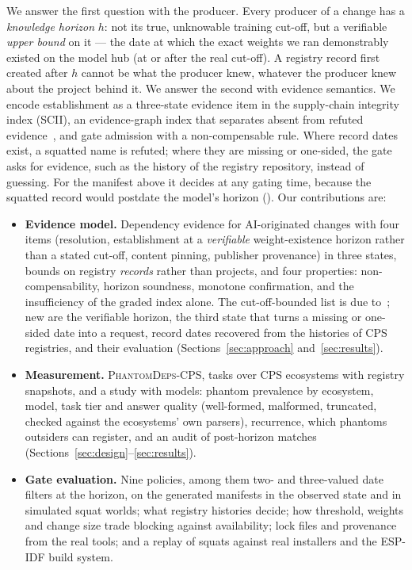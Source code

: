 \documentclass[conference]{IEEEtran}
\newif\ifpilot     \pilotfalse      %
\begin{document}
We answer the first question with the producer. Every producer of a change has a \emph{knowledge horizon} $h$: not its
true, unknowable training cut-off, but a verifiable \emph{upper bound} on it --- the date at which the exact weights we
ran demonstrably existed on the model hub (at or after the real cut-off). A registry record first created after $h$
cannot be what the producer knew, whatever the producer knew about the project behind it. We answer the second with evidence semantics. We encode establishment as a three-state evidence item in the
supply-chain integrity index (SCII), an evidence-graph index that separates absent from refuted
evidence~\cite{anon2026evidence}, and gate admission with a non-compensable rule. Where record dates exist, a squatted
name is refuted; where they are missing or one-sided, the gate asks for evidence, such as the history of the registry
repository, instead of guessing.
\ifnum{} For the manifest above it decides \rExSqDec{} at any gating time, because the squatted record
would postdate the model's horizon (\rExHorizon).\fi{} Our contributions are:
\begin{itemize}
\item \textbf{Evidence model.} Dependency evidence for AI-originated changes with four items (resolution,
establishment at a \emph{verifiable} weight-existence horizon rather than a stated cut-off, content pinning,
publisher provenance) in three states, bounds on registry \emph{records} rather than projects, and four properties:
non-compensability, horizon soundness, monotone confirmation, and the insufficiency of the graded index alone. The
cut-off-bounded list is due to~\cite{krishna2025phantoms}; new are the verifiable horizon, the third state that turns
a missing or one-sided date into a request, record dates recovered from the histories of CPS registries, and their
evaluation (Sections~\ref{sec:approach} and~\ref{sec:results}).
\item \textbf{Measurement.} \textsc{PhantomDeps-CPS}, \rNTasks{} tasks over \rNEcos{} CPS ecosystems with
registry snapshots, and a \ifpilot pilot\else study\fi{} with \rNModels{} models: phantom prevalence by ecosystem, model, task tier and answer
quality (well-formed, malformed, truncated, checked against the ecosystems' own parsers), recurrence, which phantoms
outsiders can register, and an audit of post-horizon matches (Sections~\ref{sec:design}--\ref{sec:results}).
\item \textbf{Gate evaluation.} Nine policies, among them two- and three-valued date filters at the horizon, on the
generated manifests in the observed state and in simulated squat worlds; what registry histories decide; how
threshold, weights and change size trade blocking against availability; lock files and provenance from the real
tools; and a replay of squats against real installers and the ESP-IDF build system.
\end{itemize}
\end{document}
